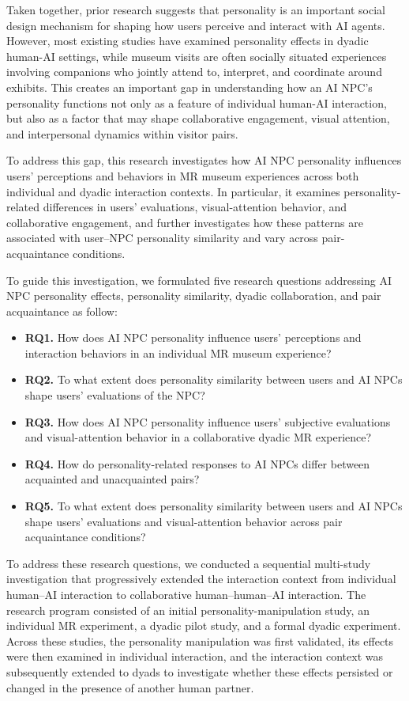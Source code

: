 \documentclass[a4paper,fleqn]{cas-sc}
\begin{document}
Taken together, prior research suggests that personality is an important social design mechanism for shaping how users perceive and interact with AI agents. However, most existing studies have examined personality effects in dyadic human-AI settings, while museum visits are often socially situated experiences involving companions who jointly attend to, interpret, and coordinate around exhibits. This creates an important gap in understanding how an AI NPC's personality functions not only as a feature of individual human-AI interaction, but also as a factor that may shape collaborative engagement, visual attention, and interpersonal dynamics within visitor pairs.

To address this gap, this research investigates how AI NPC personality influences users' perceptions and behaviors in MR museum experiences across both individual and dyadic interaction contexts. In particular, it examines personality-related differences in users' evaluations, visual-attention behavior, and collaborative engagement, and further investigates how these patterns are associated with user--NPC personality similarity and vary across pair-acquaintance conditions.

To guide this investigation, we formulated five research questions addressing AI NPC personality effects, personality similarity, dyadic collaboration, and pair acquaintance as follow: 

\begin{itemize}
    \item \textbf{RQ1.} How does AI NPC personality influence users’ perceptions and interaction behaviors in an individual MR museum experience?
    \item \textbf{RQ2.} To what extent does personality similarity between users and AI NPCs shape users’ evaluations of the NPC?
    \item \textbf{RQ3.} How does AI NPC personality influence users' subjective evaluations and visual-attention behavior in a collaborative dyadic MR experience? 
    \item \textbf{RQ4.} How do personality-related responses to AI NPCs differ between acquainted and unacquainted pairs?
    \item \textbf{RQ5.} To what extent does personality similarity between users and AI NPCs shape users' evaluations and visual-attention behavior across pair acquaintance conditions?
\end{itemize}

To address these research questions, we conducted a sequential multi-study investigation that progressively extended the interaction context from individual human--AI interaction to collaborative human--human--AI interaction. The research program consisted of an initial personality-manipulation study, an individual MR experiment, a dyadic pilot study, and a formal dyadic experiment. Across these studies, the personality manipulation was first validated, its effects were then examined in individual interaction, and the interaction context was subsequently extended to dyads to investigate whether these effects persisted or changed in the presence of another human partner.
\end{document}
